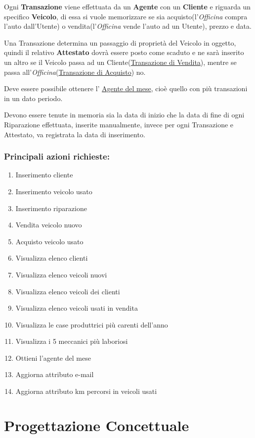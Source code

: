 \documentclass[a4paper,12pt]{report}
\begin{document}
Ogni \textbf{Transazione} viene effettuata da un \textbf{Agente} con un \textbf{Cliente} e riguarda un specifico \textbf{Veicolo},
%
di essa si vuole memorizzare se sia acquisto(l'\textit{Officina} compra l'auto dall'Utente) o vendita(l'\textit{Officina} 
% 
vende l'auto ad un Utente), prezzo e data. 

\noindent
Una Transazione determina un passaggio di proprietà del Veicolo in oggetto, quindi il relativo \textbf{Attestato} 
%
dovrà essere posto come scaduto e ne sarà inserito un altro se il Veicolo passa ad un Cliente(\underline{Transazione di Vendita}),
%
mentre se passa all'\textit{Officina}(\underline{Transazione di Acquisto}) no.

Deve essere possibile ottenere l' \underline{Agente del mese}, cioè quello con più transazioni in un dato periodo. 

Devono essere tenute in memoria sia la data di inizio che la data di fine di ogni Riparazione effettuata, inserite manualmente,
%
invece per ogni Transazione e Attestato, va registrata la data di inserimento.

\subsection*{Principali azioni richieste:}
\begin{enumerate}
	\item Inserimento cliente
	\item Inserimento veicolo usato
	\item Inserimento riparazione
	\item Vendita veicolo nuovo
	\item Acquisto veicolo usato 
	\item Visualizza elenco clienti
	\item Visualizza elenco veicoli nuovi
	\item Visualizza elenco veicoli dei clienti
	\item Visualizza elenco veicoli usati in vendita 
	\item Visualizza le case produttrici più carenti dell'anno 
	\item Visualizza i 5 meccanici più laboriosi
	\item Ottieni l'agente del mese
	\item Aggiorna attributo e-mail
	\item Aggiorna attributo km percorsi in veicoli usati 
\end{enumerate}

\chapter{Progettazione Concettuale}
\end{document}
